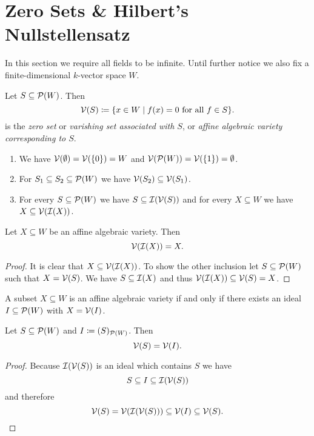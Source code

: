 \section{Zero Sets \& Hilbert’s Nullstellensatz}
In this section we require all fields to be infinite.
Until further notice we also fix a finite-dimensional $k$-vector space $W$.


\begin{defi}
  Let $S \subseteq \mathcal{P}(W)$.
  Then
  \[
              \mathcal{V}(S)
    \coloneqq \{
                x \in W
              \mid
                f(x) = 0
                \text{ for all }
                f \in S
              \}.
  \]
  is the \emph{zero set} or \emph{varishing set associated with $S$}, or \emph{affine algebraic variety corresponding to $S$}.
\end{defi}


\begin{expls}
  \begin{enumerate}[label=\emph{\alph*)},leftmargin=*]
    \item
      We have $\mathcal{V}(\emptyset) = \mathcal{V}(\{0\}) = W$ and $\mathcal{V}(\mathcal{P}(W)) = \mathcal{V}(\{1\}) = \emptyset$.
    \item
      For $S_1 \subseteq S_2 \subseteq \mathcal{P}(W)$ we have $\mathcal{V}(S_2) \subseteq \mathcal{V}(S_1)$.
    \item
      For every $S \subseteq \mathcal{P}(W)$ we have $S \subseteq \mathcal{I}(\mathcal{V}(S))$ and for every $X \subseteq W$ we have $X \subseteq \mathcal{V}(\mathcal{I}(X))$.
  \end{enumerate}
\end{expls}


\begin{lem}
  Let $X \subseteq W$ be an affine algebraic variety. Then
  \[
      \mathcal{V}(\mathcal{I}(X))
    = X.
  \]
\end{lem}
\begin{proof}
  It is clear that $X \subseteq \mathcal{V}(\mathcal{I}(X))$.
  To show the other inclusion let $S \subseteq \mathcal{P}(W)$ such that $X = \mathcal{V}(S)$.
  We have $S \subseteq \mathcal{I}(X)$ and thus $\mathcal{V}(\mathcal{I}(X)) \subseteq \mathcal{V}(S) = X$.
\end{proof}


\begin{cor}
  A subset $X \subseteq W$ is an affine algebraic variety if and only if there exists an ideal $I \subseteq \mathcal{P}(W)$ with $X = \mathcal{V}(I)$.
\end{cor}


\begin{cor}
  Let $S \subseteq \mathcal{P}(W)$ and $I \coloneqq (S)_{\mathcal{P}(W)}$. Then
  \[
      \mathcal{V}(S)
    = \mathcal{V}(I).
  \]
\end{cor}
\begin{proof}
  Because $\mathcal{I}(\mathcal{V}(S))$ is an ideal which contains $S$ we have
  \[
              S
    \subseteq I
    \subseteq \mathcal{I}(\mathcal{V}(S))
  \]
  and therefore
  \[
              \mathcal{V}(S)
    =         \mathcal{V}( \mathcal{I}( \mathcal{V}(S) ) )
    \subseteq \mathcal{V}(I)
    \subseteq \mathcal{V}(S).
    \qedhere
  \]
\end{proof}


